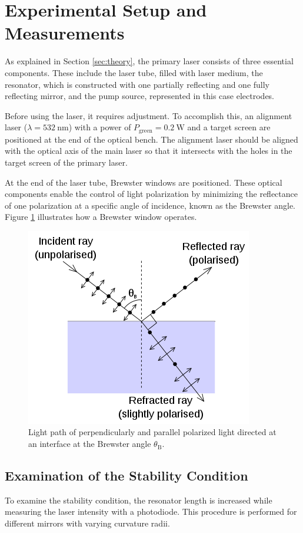 \section{Experimental Setup and Measurements}
\label{sec:procedure}

As explained in Section \ref{sec:theory}, the primary laser 
consists of three essential components. These 
include the laser tube, filled with laser medium, the resonator, 
which is constructed with one partially reflecting and one
fully reflecting mirror, and the pump source, represented in this 
case electrodes. 

Before using the laser, it requires adjustment. To accomplish this,
an alignment laser ($\lambda=\SI{532}{\nano\meter}$) with a power 
of $P_\text{green}=\SI{0.2}{\watt}$ and a target screen are positioned
at the end of the optical bench. The alignment laser should be aligned 
with the optical axis of the main laser so that it intersects with 
the holes in the target screen of the primary laser.  

At the end of the laser tube, Brewster windows are positioned. 
These optical components enable the control of light polarization
by minimizing the reflectance of one polarization at a specific
angle of incidence, known as the Brewster angle. Figure \ref{fig:brewster}
illustrates how a Brewster window operates.

\begin{figure}
    \centering
    \includegraphics[width=0.5\linewidth]{pictures/Brewster.png} %
    \caption{Light path of perpendicularly and parallel polarized light directed at an interface at the Brewster angle $\theta_\text{B}$. \cite{Brewster}}
    \label{fig:brewster}
\end{figure}

\subsection{Examination of the Stability Condition}
To examine the stability condition, the resonator length is increased
while measuring the laser intensity with a photodiode. This
procedure is performed for different mirrors with varying curvature 
radii.

